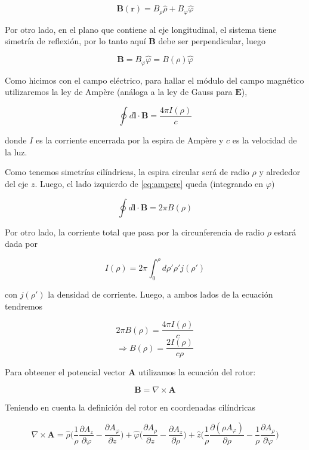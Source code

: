 $$\mathbf{B(r)} = B_{\rho}\hat{\rho} + B_{\varphi}\hat{\varphi}$$

Por otro lado, en el plano que contiene al eje longitudinal, el sistema tiene simetr\'ia de reflexi\'on, por lo tanto aqu\'i $\mathbf{B}$ debe ser perpendicular, luego

$$\mathbf{B} = B_{\varphi}\hat{\varphi} = B(\rho) \hat{\varphi}$$

Como hicimos con el campo el\'ectrico, para hallar el m\'odulo del campo magn\'etico utilizaremos la ley de Amp\`ere (an\'aloga a la ley de Gauss para $\mathbf{E}$),

\begin{equation}
    \label{eq:ampere}
    \oint d\mathbf{l} \cdot \mathbf{B} = \frac{4\pi I(\rho)}{c}
\end{equation}

donde $I$ es la corriente encerrada por la espira de Amp\`ere y $c$ es la velocidad de la luz.\newline

Como tenemos simetr\'ias cil\'indricas, la espira circular ser\'a de radio $\rho$ y alrededor del eje $z$. Luego, el lado izquierdo de \ref{eq:ampere} queda (integrando en $\varphi)$

$$\oint d\mathbf{l} \cdot \mathbf{B} = 2\pi B(\rho)$$

Por otro lado, la corriente total que pasa por la circunferencia de radio $\rho$ estar\'a dada por

$$I(\rho) = 2\pi \int_{0}^{\rho} d\rho' \rho' j(\rho')$$

con $j(\rho')$ la densidad de corriente. Luego, a ambos lados de la ecuaci\'on tendremos

$$2\pi B(\rho) = \frac{4\pi I(\rho)}{c}$$
$$ \Rightarrow B(\rho) = \frac{2 I(\rho)}{c\rho}$$

Para obteener el potencial vector $\mathbf{A}$ utilizamos la ecuaci\'on del rotor:

$$\mathbf{B} = \nabla \times \mathbf{A}$$

Teniendo en cuenta la definici\'on del rotor en coordenadas cil\'indricas

$$\nabla \times \mathbf{A} = \hat{\rho}\bigg(\frac{1}{\rho}\frac{\partial A_{z}}{\partial \varphi} - \frac{\partial A_{\varphi}}{\partial z}\bigg) + \hat{\varphi}\bigg(\frac{\partial A_{\rho}}{\partial z} - \frac{\partial A_{z}}{\partial \rho}\bigg) + \hat{z}\bigg(\frac{1}{\rho}\frac{\partial (\rho A_{\varphi})}{\partial \rho} - \frac{1}{\rho}\frac{\partial A_{\rho}}{\partial \varphi}\bigg)$$

